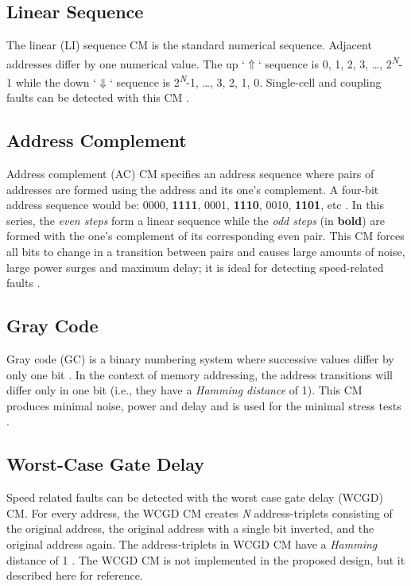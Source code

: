 \subsection{Linear Sequence}
The linear (LI) sequence CM is the standard numerical sequence.  Adjacent addresses differ by one numerical value.  The up `$\Uparrow$` sequence is 0, 1, 2, 3, \ldots, 2\textsuperscript{\textit{N}}-1 while the down `$\Downarrow$` sequence is 2\textsuperscript{\textit{N}}-1, \ldots, 3, 2, 1, 0.  Single-cell and coupling faults can be detected with this CM \cite{5941430}.

\subsection{Address Complement}
Address complement (AC) CM specifies an address sequence where pairs of addresses are formed using the address and its one's complement.  A four-bit address sequence would be: 0000, \textbf{1111}, 0001, \textbf{1110}, 0010, \textbf{1101}, etc \cite{VanDeGoor1991}.  In this series, the \textit{even steps} form a linear sequence while the \textit{odd steps} (in \textbf{bold}) are formed with the one's complement of its corresponding even pair.  This CM forces all bits to change in a transition between pairs and causes large amounts of noise, large power surges and maximum delay; it is ideal for detecting speed-related faults \cite{5941430}.

\subsection{Gray Code}
Gray code (GC) is a binary numbering system where successive values differ by only one bit \cite{VanDeGoor1991}.  In the context of memory addressing, the address transitions will differ only in one bit (i.e., they have a \textit{Hamming distance} of 1).  This CM produces minimal noise, power and delay and is used for the minimal stress tests \cite{5941430}.

\subsection{Worst-Case Gate Delay}
Speed related faults can be detected with the worst case gate delay (WCGD) CM.  For every address, the WCGD CM creates \textit{N} address-triplets consisting of the original address, the original address with a single bit inverted, and the original address again.  The address-triplets in WCGD CM have a \textit{Hamming} distance of 1 \cite{5359299}.  The WCGD CM is not implemented in the proposed design, but it described here for reference.

